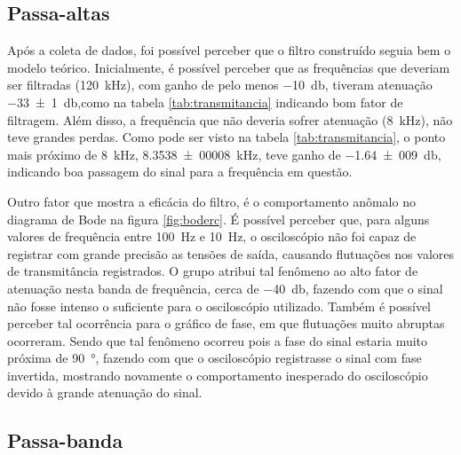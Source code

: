 
\subsection{Passa-altas}

  Após a coleta de dados, foi possível perceber que o filtro construído seguia bem o modelo teórico. Inicialmente, é possível perceber que as frequências que deveriam ser filtradas (\SI{120}{\kilo\hertz}), com ganho de pelo menos \SI{-10}{\decibel}, tiveram atenuação \SI{-33(1)}{\decibel},como na tabela \ref{tab:transmitancia} indicando bom fator de filtragem. Além disso, a frequência que não deveria sofrer atenuação (\SI{8}{\kilo\hertz}), não teve grandes perdas. Como pode ser visto na tabela \ref{tab:transmitancia}, o ponto mais próximo de \SI{8}{\kilo\hertz}, \SI{8,3538(00008)}{\kilo\hertz}, teve ganho de \SI{-1,64(009)}{\decibel}, indicando boa passagem do sinal para a frequência em questão.\par
  Outro fator que mostra a eficácia do filtro, é o comportamento anômalo no diagrama de Bode na figura \ref{fig:boderc}. É possível perceber que, para alguns valores de frequência entre \SI{100}{\hertz} e \SI{10}{\hertz}, o osciloscópio não foi capaz de registrar com grande precisão as tensões de saída, causando flutuações nos valores de transmitância registrados. O grupo atribui tal fenômeno ao alto fator de atenuação nesta banda de frequência, cerca de \SI{-40}{\decibel}, fazendo com que o sinal não fosse intenso o suficiente para o osciloscópio utilizado. Também é possível perceber tal ocorrência para o gráfico de fase, em que flutuações muito abruptas ocorreram. Sendo que tal fenômeno ocorreu pois a fase do sinal estaria muito próxima de \SI{90}{\degree}, fazendo com que o osciloscópio registrasse o sinal com fase invertida, mostrando novamente o comportamento inesperado do osciloscópio devido à grande atenuação do sinal.
  \pagebreak
  
  \subsection{Passa-banda}